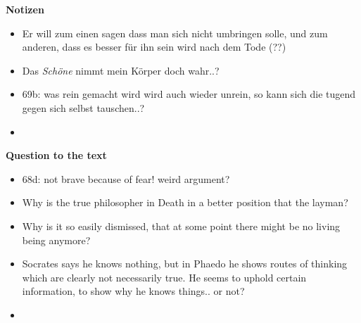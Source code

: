 \documentclass[emulatestandardclasses]{scrartcl}
\begin{document}
\textbf{Notizen}

\begin{itemize}
  \item Er will zum einen sagen dass man sich nicht umbringen solle, und zum anderen, dass es besser für ihn sein wird nach dem Tode (??)
  \item Das \emph{Schöne} nimmt mein Körper doch wahr..?
  \item 69b: was rein gemacht wird wird auch wieder unrein, so kann sich die tugend gegen sich selbst tauschen..?
  \item 
\end{itemize}

\textbf{Question to the text}

\begin{itemize}
  \item 68d: not brave because of fear! weird argument?
  \item Why is the true philosopher in Death in a better position that the layman?
  \item Why is it so easily dismissed, that at some point there might be no living being anymore?
  \item Socrates says he knows nothing, but in Phaedo he shows routes of thinking which are clearly not necessarily true. He seems to uphold certain information, to show why he knows things.. or not?
  \item 
\end{itemize}


\newpage
%


\end{document}
